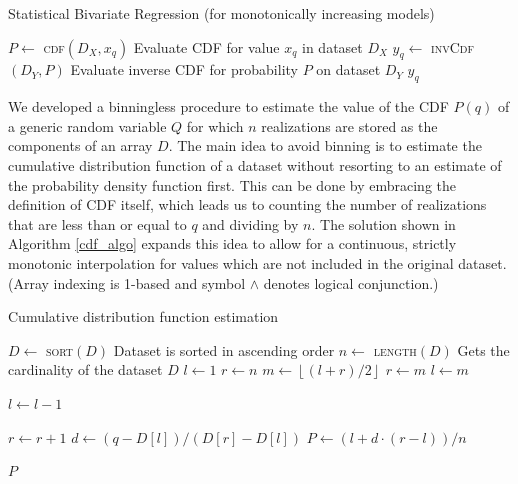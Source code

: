 \documentclass[10pt,final]{siamltex}
\begin{document}
\begin{algorithm}
  \caption{Statistical Bivariate Regression (for monotonically increasing models)}
  \label{regression_algo}
  \begin{algorithmic}[1]
    \State $P \gets$ \textsc{cdf}$(D_X, x_q)$
    \Comment Evaluate CDF for value $x_q$ in dataset $D_X$
    \State $y_q \gets$ \textsc{invCdf}$(D_Y, P)$
    \Comment Evaluate inverse CDF for probability $P$ on dataset $D_Y$
    \State \Return $y_q$
    \EndFunction
  \end{algorithmic}
\end{algorithm}
%

We developed a binningless procedure to estimate the value of the CDF $P(q)$ of a generic random variable $Q$ for which $n$ realizations are stored as the components of an array $D$.
The main idea to avoid binning is to estimate the cumulative distribution function of a dataset without resorting to an estimate of the probability density function first. This can be done by embracing the definition of CDF itself, which leads us to counting the number of realizations that are less than or equal to $q$ and dividing by $n$. The solution shown in Algorithm \ref{cdf_algo} expands this idea to allow for a continuous, strictly monotonic interpolation for values which are not included in the original dataset. (Array indexing is 1-based and symbol $\land$ denotes logical conjunction.)

\begin{algorithm}
  \caption{Cumulative distribution function estimation}
  \label{cdf_algo}
  \begin{algorithmic}[1]
    \State $D \gets$ \textsc{sort}$(D)$
    \Comment Dataset is sorted in ascending order
    \State $n \gets$ \textsc{length}$(D)$
    \Comment Gets the cardinality of the dataset $D$
    \State $l \gets 1$
    \State $r \gets n$
    \State $m \gets \left \lfloor{(l+r)/2}\right \rfloor$
    \State $r \gets m$
    \Else
    \State $l \gets m$
    \EndIf
    \EndWhile


    \State $l \gets l - 1$
    \EndWhile

    \State $r \gets r + 1$
    \EndWhile
    \State $d \gets (q-D[l])/(D[r]-D[l])$
    \State $P \gets (l + d \cdot (r - l))/n $

    \EndIf

    \State \Return $P$
    \EndFunction
  \end{algorithmic}
\end{algorithm}
\end{document}
